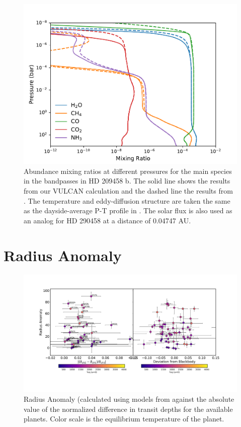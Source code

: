 \begin{subappendices}
  \begin{figure}
      \centering
      \includegraphics[width = \linewidth]{HD209-referee.pdf}
      \caption{Abundance mixing ratios at different pressures for the main species in the \spitzer bandpasses in HD 209458 b. The solid line shows the results from our VULCAN calculation and the dashed line the results from \citet{Moses2011}. The temperature and eddy-diffusion structure are taken the same as the dayside-average P-T profile in \citet{Moses2011}. The solar flux is also used as an analog for HD 290458 at a distance of 0.04747 AU.}
      \label{P1:fig:HD209}
  \end{figure}

  \section{Radius Anomaly}

  \begin{figure}
      \centering
      \includegraphics[width = \textwidth]{RadiusAnomaly.pdf}
      \caption{Radius Anomaly (calculated using models from \citet{Thorngren2016, Thorngren2018} against the absolute value of the normalized difference in transit depths for the available planets. Color scale is the equilibrium temperature of the planet.}
      \label{P1:fig:RadiusAnomaly}
  \end{figure}

\end{subappendices}



